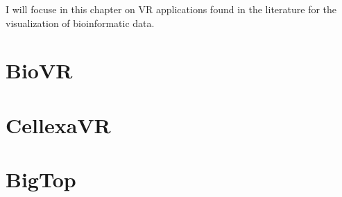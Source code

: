 I will focuse in this chapter on VR applications found in the literature for the visualization of bioinformatic data.

\section{BioVR}

\section{CellexaVR}

\section{BigTop}
